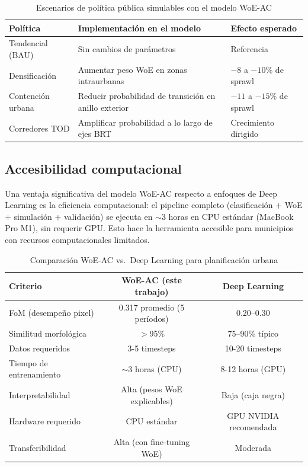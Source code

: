 \begin{table}[htbp]
\centering
\caption{Escenarios de política pública simulables con el modelo WoE-AC}
\label{tab:policy_scenarios}
\begin{tabular}{lp{6cm}l}
\toprule
\textbf{Política} & \textbf{Implementación en el modelo} & \textbf{Efecto esperado} \\
\midrule
Tendencial (BAU) & Sin cambios de parámetros & Referencia \\
Densificación & Aumentar peso WoE en zonas intraurbanas & $-8$ a $-10\%$ de sprawl \\
Contención urbana & Reducir probabilidad de transición en anillo exterior & $-11$ a $-15\%$ de sprawl \\
Corredores TOD & Amplificar probabilidad a lo largo de ejes BRT & Crecimiento dirigido \\
\bottomrule
\end{tabular}
\end{table}

\subsection{Accesibilidad computacional}

Una ventaja significativa del modelo WoE-AC respecto a enfoques de Deep Learning es la eficiencia computacional: el pipeline completo (clasificación + WoE + simulación + validación) se ejecuta en $\sim$3 horas en CPU estándar (MacBook Pro M1), sin requerir GPU. Esto hace la herramienta accesible para municipios con recursos computacionales limitados.

\begin{table}[htbp]
\centering
\caption{Comparación WoE-AC vs.\ Deep Learning para planificación urbana}
\label{tab:dl_comparison}
\begin{tabular}{lcc}
\toprule
\textbf{Criterio} & \textbf{WoE-AC (este trabajo)} & \textbf{Deep Learning} \\
\midrule
FoM (desempeño pixel) & 0.317 promedio (5 períodos) & 0.20--0.30 \\
Similitud morfológica & $>$95\% & 75--90\% típico \\
Datos requeridos & 3-5 timesteps & 10-20 timesteps \\
Tiempo de entrenamiento & $\sim$3 horas (CPU) & 8-12 horas (GPU) \\
Interpretabilidad & Alta (pesos WoE explicables) & Baja (caja negra) \\
Hardware requerido & CPU estándar & GPU NVIDIA recomendada \\
Transferibilidad & Alta (con fine-tuning WoE) & Moderada \\
\bottomrule
\end{tabular}
\end{table}

